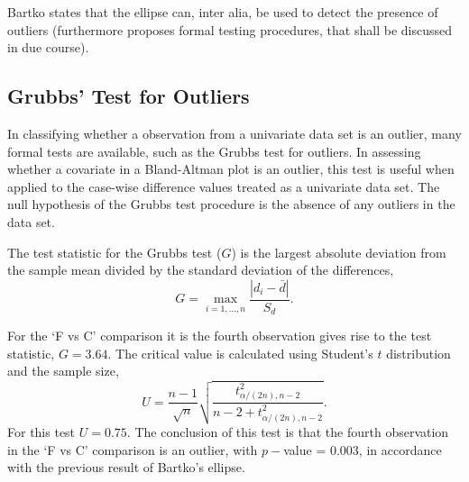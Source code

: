\documentclass[12pt, a4paper]{report}
\theoremstyle{plain}
\theoremstyle{definition}
\theoremstyle{remark}
\begin{document}
Bartko states that the ellipse can, inter alia, be used to detect the presence of outliers (furthermore
\citet{Bartko} proposes formal testing procedures, that shall be discussed in due course). 











\subsection{Grubbs' Test for Outliers}


In classifying whether a observation from a univariate data set is an outlier, many formal tests are available, such as the Grubbs test for outliers. In assessing whether a covariate in a Bland-Altman plot is an outlier, this test is useful when applied to the case-wise difference values treated as a univariate data set. The null hypothesis of the Grubbs test procedure is the absence of any outliers in the data set. 

The test statistic for the Grubbs test ($G$) is the largest absolute deviation from the sample mean divided by the standard
deviation of the differences,
\begin{equation}
G =  \displaystyle\max_{i=1,\ldots, n}\frac{\left \vert d_i -
	\bar{d}\right\vert}{S_{d}}.
\end{equation}

For the `F vs C' comparison it is the fourth observation gives rise to the test statistic, $G = 3.64$. The critical value is
calculated using Student's $t$ distribution and the sample size,
\[
U = \frac{n-1}{\sqrt{n}} \sqrt{\frac{t_{\alpha/(2n),n-2}^2}{n - 2
		+ t_{\alpha/(2n),n-2}^2}}.
\]
For this test $U = 0.75$. The conclusion of this test is that the fourth observation in the `F vs C' comparison is an outlier, with $p-$value = 0.003, in accordance with the previous result of Bartko's ellipse.
\end{document}
